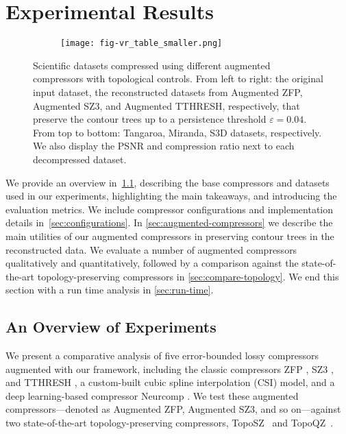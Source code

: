 \section{Experimental Results}
\label{sec:results}

\begin{figure*}[!ht]
    \centering
    \begin{subfigure}{0.02\textwidth}
    \end{subfigure}
    \begin{subfigure}{0.92\textwidth}
    \texttt{[image: fig-vr\_table\_smaller.png]}
    \end{subfigure}
    \vspace{-3mm}
    \caption{Scientific datasets compressed using different augmented compressors with topological controls. From left to right: the original input dataset, the reconstructed datasets from Augmented ZFP, Augmented SZ3, and Augmented TTHRESH, 
    respectively, that preserve the contour trees up to a persistence threshold $\varepsilon = 0.04$. From top to bottom: Tangaroa, Miranda, S3D datasets, respectively. We also display the PSNR and compression ratio next to each decompressed dataset.}    
    \label{fig:volume-render}
    \vspace{-6mm}
\end{figure*}

We provide an overview in~\cref{sec:results-overview}, describing the base compressors and datasets used in our experiments, highlighting the main takeaways, and introducing the evaluation metrics. 
We include compressor configurations and implementation details in~\cref{sec:configurations}. 
In \cref{sec:augmented-compressors} we describe the main utilities of our augmented compressors in preserving contour trees in the reconstructed data.
We evaluate a number of augmented compressors qualitatively and quantitatively, followed by a comparison against the state-of-the-art topology-preserving compressors in \cref{sec:compare-topology}.
We end this section with a run time analysis in \cref{sec:run-time}.

\subsection{An Overview of Experiments}
\label{sec:results-overview}

We present a comparative analysis of five error-bounded lossy compressors augmented with our framework, including the classic compressors ZFP \cite{lindstrom2014fixed}, SZ3 \cite{liang2022sz3}, and TTHRESH \cite{ballester2019tthresh}, a custom-built cubic spline interpolation (CSI) model, and a deep learning-based compressor Neurcomp \cite{lu2021compressive}. 
We test these augmented compressors---denoted as Augmented ZFP, Augmented SZ3, and so on---against two state-of-the-art topology-preserving compressors, TopoSZ~\cite{soler2018topologically} and TopoQZ~\cite{yan2023toposz}. 

